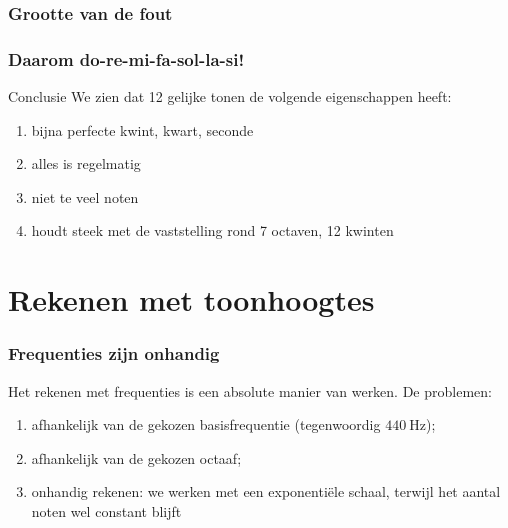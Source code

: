 \documentclass[compress, darktitle, framenumber, totalframenumber]{beamer}
\begin{document}
\begin{frame}
  \frametitle{Grootte van de fout}

  \begin{center}
  \end{center}
\end{frame}

\begin{frame}
  \frametitle{Daarom do-re-mi-fa-sol-la-si!}

  \begin{block}{Conclusie}
    We zien dat \alert{12 gelijke tonen} de volgende eigenschappen heeft:
    \begin{enumerate}
      \item bijna perfecte kwint, kwart, seconde
      \item alles is regelmatig
      \item niet te veel noten
      \item houdt steek met de vaststelling rond 7 octaven, 12 kwinten
    \end{enumerate}
  \end{block}
\end{frame}


\section{Rekenen met toonhoogtes}

\begin{frame}
  \frametitle{Frequenties zijn onhandig}

  Het rekenen met frequenties is een \alert{absolute} manier van werken. \pause De problemen:
  \begin{enumerate}
    \item afhankelijk van de gekozen basisfrequentie (tegenwoordig $\SI{440}{\hertz}$);
    \item afhankelijk van de gekozen octaaf;
    \item onhandig rekenen: we werken met een \alert{exponenti\"ele schaal}, terwijl het aantal noten wel constant blijft
  \end{enumerate}
  \begin{center}
  \end{center}
\end{frame}
\end{document}

